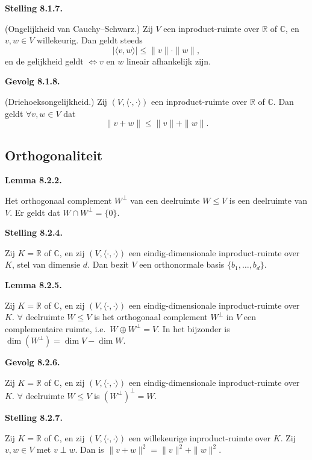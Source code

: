 \documentclass[10pt,a4paper]{article}
\newenvironment{res}[2]{%
  \par\noindent\textbf{#1 #2.}%
}{%
  \par\vspace{2pt}\normalfont
}
\begin{document}
\begin{res}{Stelling}{8.1.7}
\textup{(Ongelijkheid van Cauchy--Schwarz.)} Zij $V$ een inproduct-ruimte over $\mathbb R$ of $\mathbb C$, en $v,w\in V$ willekeurig. Dan geldt steeds
\[
|\langle v,w\rangle|\le\|v\|\cdot\|w\|,
\]
en de gelijkheid geldt  $ \iff v$ en $w$ lineair afhankelijk zijn.
\end{res}

\begin{res}{Gevolg}{8.1.8}
\textup{(Driehoeksongelijkheid.)} Zij $(V,\langle\cdot,\cdot\rangle)$ een inproduct-ruimte over $\mathbb R$ of $\mathbb C$. Dan geldt  $\forall v,w\in V$ dat
\[
\|v+w\|\le\|v\|+\|w\|.
\]
\end{res}
\subsection{Orthogonaliteit}
\begin{res}{Lemma}{8.2.2}
Het orthogonaal complement $W^\perp$ van een deelruimte $W\le V$ is een deelruimte van $V$.
Er geldt dat $W\cap W^\perp=\{0\}$.
\end{res}

\begin{res}{Stelling}{8.2.4}
Zij $K=\mathbb R$ of $\mathbb C$, en zij $(V,\langle\cdot,\cdot\rangle)$ een eindig-dimensionale inproduct-ruimte over $K$, stel van dimensie $d$. Dan bezit $V$ een orthonormale basis $\{b_1,\dots,b_d\}$.
\end{res}

\begin{res}{Lemma}{8.2.5}
Zij $K=\mathbb R$ of $\mathbb C$, en zij $(V,\langle\cdot,\cdot\rangle)$ een eindig-dimensionale inproduct-ruimte over $K$.
\(\forall\) deelruimte $W\le V$ is het orthogonaal complement $W^\perp$ in $V$ een complementaire ruimte, i.e.\ $W\oplus W^\perp=V$. In het bijzonder is $\dim(W^\perp)=\dim V-\dim W$.
\end{res}

\begin{res}{Gevolg}{8.2.6}
Zij $K=\mathbb R$ of $\mathbb C$, en zij $(V,\langle\cdot,\cdot\rangle)$ een eindig-dimensionale inproduct-ruimte over $K$.
\(\forall\) deelruimte $W\le V$ is $(W^\perp)^\perp=W$.
\end{res}

\begin{res}{Stelling}{8.2.7}
Zij $K=\mathbb R$ of $\mathbb C$, en zij $(V,\langle\cdot,\cdot\rangle)$ een willekeurige inproduct-ruimte over $K$. Zij $v,w\in V$ met $v\perp w$. Dan is $\|v+w\|^2=\|v\|^2+\|w\|^2$.
\end{res}
\end{document}
